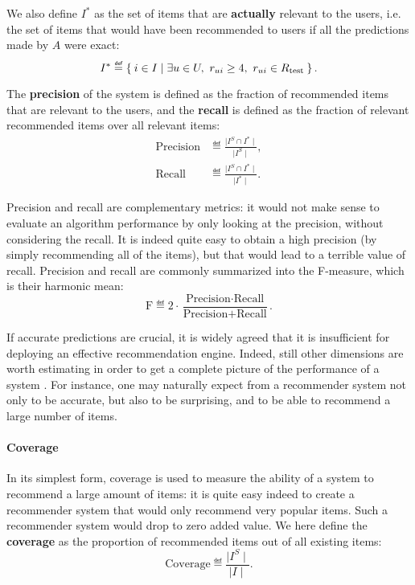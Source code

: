 We also define $I^*$ as the set of items that are \textbf{actually} relevant to
the users, i.e.  the set of items that would have been recommended to users if
all the predictions made by $A$ were exact:
$$I^* \eqdef \Set{i \in I | \exists u \in U, ~\rui \geq 4,~ \rui \in \Rtest}.$$

\noindent
The \textbf{precision} of the
system is
defined as the fraction of recommended items that are relevant to the users,
and the \textbf{recall} is defined as the fraction of relevant recommended
items over all relevant items:
\begin{align*}
  \text{Precision} &\eqdef \frac{\mid I^S \cap I^*\mid}{\mid I^S \mid},\\
  \text{Recall} &\eqdef \frac{\mid I^S \cap I^*\mid}{\mid I^* \mid}.
\end{align*}

Precision and recall are complementary metrics: it would not make sense to
evaluate an algorithm performance by only looking at the precision, without
considering the recall. It is indeed quite easy to obtain a high precision (by
simply recommending all of the items), but that would lead to a terrible
value of recall. Precision and recall are commonly summarized into the
F-measure, which is their harmonic mean:
  $$
  \text{F} \eqdef 2 \cdot \frac{\text{Precision} \cdot
  \text{Recall}}{\text{Precision} + \text{Recall}}.
  $$

If accurate predictions are crucial, it is widely agreed that it is
insufficient for deploying an effective recommendation engine. Indeed, still
other dimensions are worth estimating in order to get a complete picture of the
performance of a system
\cite{NeeRieKonACM2006,HerKonJohTerRieACM2004,KamBriRecSys2014}.  For instance,
one may naturally expect from a recommender system not only to be accurate, but
also to be surprising, and to be able to recommend a large number of items.

\paragraph{Coverage\\}
In its simplest form, coverage is used to measure the ability of a system to
recommend a large amount of items: it is quite easy indeed to create a
recommender system that would only recommend very popular items. Such a
recommender system would drop to zero added value. We here define the
\textbf{coverage} as the proportion of recommended items out of all existing
items:
$$\text{Coverage} \eqdef \frac{\mid I^S\mid}{\mid I\mid}.$$

